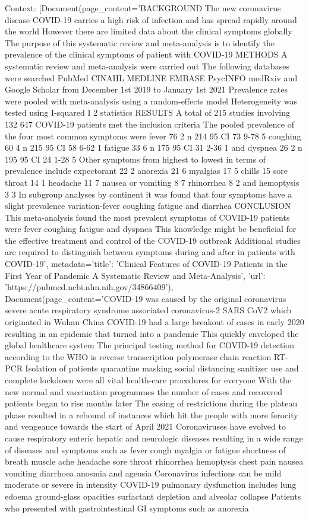Context: [Document(page\_content='BACKGROUND The new coronavirus disease COVID-19 carries a high risk of infection and has spread rapidly around the world However there are limited data about the clinical symptoms globally The purpose of this systematic review and meta-analysis is to identify the prevalence of the clinical symptoms of patient with COVID-19 METHODS A systematic review and meta-analysis were carried out The following databases were searched PubMed CINAHL MEDLINE EMBASE PsycINFO medRxiv and Google Scholar from December 1st 2019 to January 1st 2021 Prevalence rates were pooled with meta-analysis using a random-effects model Heterogeneity was tested using I-squared I 2 statistics RESULTS A total of 215 studies involving 132 647 COVID-19 patients met the inclusion criteria The pooled prevalence of the four most common symptoms were fever 76 2 n 214 95 CI 73 9-78 5 coughing 60 4 n 215 95 CI 58 6-62 1 fatigue 33 6 n 175 95 CI 31 2-36 1 and dyspnea 26 2 n 195 95 CI 24 1-28 5 Other symptoms from highest to lowest in terms of prevalence include expectorant 22 2 anorexia 21 6 myalgias 17 5 chills 15 sore throat 14 1 headache 11 7 nausea or vomiting 8 7 rhinorrhea 8 2 and hemoptysis 3 3 In subgroup analyses by continent it was found that four symptoms have a slight prevalence variation-fever coughing fatigue and diarrhea CONCLUSION This meta-analysis found the most prevalent symptoms of COVID-19 patients were fever coughing fatigue and dyspnea This knowledge might be beneficial for the effective treatment and control of the COVID-19 outbreak Additional studies are required to distinguish between symptoms during and after in patients with COVID-19', metadata={'title': 'Clinical Features of COVID-19 Patients in the First Year of Pandemic A Systematic Review and Meta-Analysis', 'url': 'https://pubmed.ncbi.nlm.nih.gov/34866409'}), Document(page\_content='COVID-19 was caused by the original coronavirus severe acute respiratory syndrome associated coronavirus-2 SARS CoV2 which originated in Wuhan China COVID-19 had a large breakout of cases in early 2020 resulting in an epidemic that turned into a pandemic This quickly enveloped the global healthcare system The principal testing method for COVID-19 detection according to the WHO is reverse transcription polymerase chain reaction RT-PCR Isolation of patients quarantine masking social distancing sanitizer use and complete lockdown were all vital health-care procedures for everyone With the new normal and vaccination programmes the number of cases and recovered patients began to rise months later The easing of restrictions during the plateau phase resulted in a rebound of instances which hit the people with more ferocity and vengeance towards the start of April 2021 Coronaviruses have evolved to cause respiratory enteric hepatic and neurologic diseases resulting in a wide range of diseases and symptoms such as fever cough myalgia or fatigue shortness of breath muscle ache headache sore throat rhinorrhea hemoptysis chest pain nausea vomiting diarrhoea anosmia and ageusia Coronavirus infections can be mild moderate or severe in intensity COVID-19 pulmonary dysfunction includes lung edoema ground-glass opacities surfactant depletion and alveolar collapse Patients who presented with gastrointestinal GI symptoms such as anorexia 